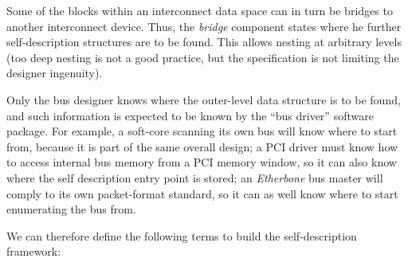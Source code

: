 \documentclass[a4paper, 12pt]{article}
\begin{document}
Some of the blocks within an interconnect data space can in turn be
bridges to another interconnect device.  Thus, the \textit{bridge}
component states where he further self-description structures are to
be found. This allows nesting at arbitrary levels (too deep nesting is
not a good practice, but the specification is not limiting the
designer ingenuity).

Only the bus designer knows where the outer-level data structure is to
be found, and such information is expected to be known by the ``bus
driver'' software package.  For example, a soft-core scanning its own
bus will know where to start from, because it is part of the same
overall design; a PCI driver must know how to access internal bus
memory from a PCI memory window, so it can also know where the
self description entry point is stored; an \textit{Etherbone} bus master will
comply to its own packet-format standard, so it can as well know
where to start enumerating the bus from.

We can therefore define the following terms to build the
self-description framework:
\end{document}
